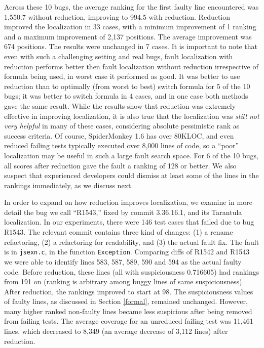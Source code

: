 Across these 10 bugs, the average ranking for the first faulty line
encountered was 1,550.7 without reduction, improving to 994.5 with
reduction.  Reduction improved the localization in 33 cases, with a
minimum improvement of 1 ranking and a maximum improvement of 2,137
positions.  The average improvement was 674 positions.  The results
were unchanged in 7 cases. It is important to note that even with such a challenging setting and real bugs, fault localization with reduction performs better then fault localization without reduction irrespective of formula being used, in worst case it performed as good. It was better to use reduction than to optimally (from worst to
best) switch formula for 5 of the 10 bugs; it was better to switch
formula in 4 cases, and in one case both methods gave the same result.
While the results show that reduction was extremely effective in
improving localization, it is also true that the localization was
\emph{still not very helpful} in many of these cases, considering absolute pessimistic rank as success criteria.  Of course,
SpiderMonkey 1.6 has over 80KLOC, and even reduced failing tests
typically executed over 8,000 lines of code, so a ``poor''
localization may be useful in such a large fault search space.  For 6
of the 10 bugs, all scores after reduction gave the fault a ranking of
128 or better.  We also suspect that experienced developers could dismiss
at least some of the lines in the rankings immediately, as we discuss
next.

In order to expand on how reduction improves localization, we examine in more detail the bug
we call ``R1543,'' fixed by commit 3.36.16.1, and its Tarantula
localization.  In our experiments, there were 146 test cases that
failed due to bug R1543.  The relevant commit contains three kind of
changes: (1) a rename refactoring, (2) a refactoring for readability,
and (3) the actual fault fix.  The fault is in {\tt jsexn.c}, in the
function {\tt Exception}. Comparing diffs of R1542 and R1543 we were
able to identify lines 583, 587, 589, 590 and 594 as the actual faulty
code. Before reduction, these lines (all with suspiciousness 0.716605)
had rankings from 191 on (ranking is arbitrary among buggy lines of
same suspiciousness).  After reduction, the rankings improved to start
at 98.  The suspiciousness values of faulty lines, as discussed in Section
\ref{formal}, remained unchanged.  However, many higher ranked non-faulty lines
became less suspicious after being removed from failing tests.  The
average coverage for an unreduced failing test was 11,461 lines, which
decreased to 8,349 (an average decrease of 3,112 lines) after reduction.

